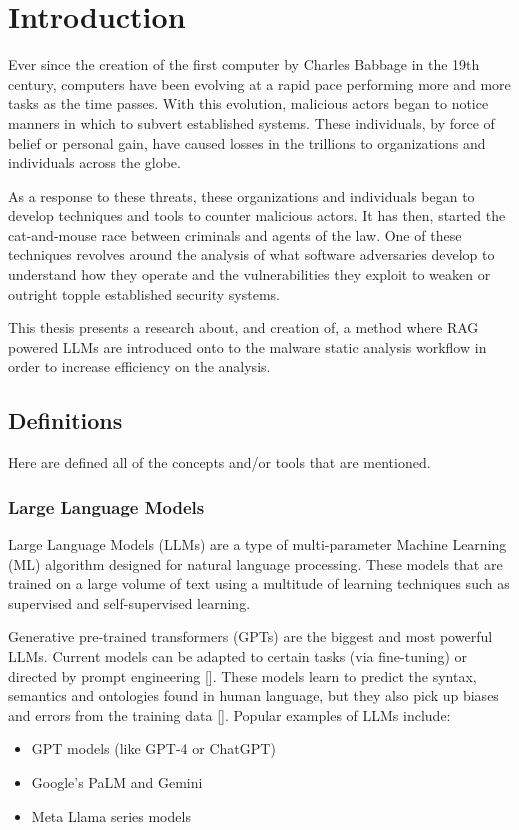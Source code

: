 
\chapter{Introduction}
\label{sec:introduction}

\label{Chapter1} %

Ever since the creation of the first computer by Charles Babbage in the 19th century, computers
have been evolving at a rapid pace performing more and more tasks as the time passes. With this
evolution, malicious actors began to notice manners in which to subvert established systems. These
individuals, by force of belief or personal gain, have caused losses in the trillions to
organizations and individuals across the globe.

As a response to these threats, these organizations and individuals began to develop techniques and
tools to counter malicious actors. It has then, started the cat-and-mouse race between criminals
and agents of the law. One of these techniques revolves around the analysis of what software
adversaries develop to understand how they operate and the vulnerabilities they exploit to weaken
or outright topple established security systems.

This thesis presents a research about, and creation of, a method where RAG powered LLMs are
introduced onto to the malware static analysis workflow in order to increase efficiency on the
analysis.

\section{Definitions}
Here are defined all of the concepts and/or tools that are mentioned.

\subsection{Large Language Models}
Large Language Models (LLMs) are a type of multi-parameter Machine Learning (ML) algorithm designed
for natural language processing. These models that are trained on a large volume of text using a
multitude of learning techniques such as supervised and self-supervised learning.

Generative pre-trained transformers (GPTs) are the biggest and most powerful LLMs. Current models
can be adapted to certain tasks (via fine-tuning) or directed by prompt engineering
	[\cite{brown2020languagemodelsfewshotlearners}]. These models learn to predict the syntax,
semantics and ontologies found in human language, but they also pick up biases and errors from the
training data [\cite{10.1162/daed_a_01905}]. Popular examples of LLMs include:
\begin{itemize}
	\item GPT models (like GPT-4 or ChatGPT)
	\item Google's PaLM and Gemini
	\item Meta Llama series models
\end{itemize}

